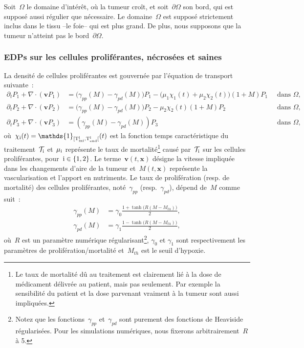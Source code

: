 \documentclass[11pt]{amsart}
\numberwithin{equation}{section}
\newcommand{\treat}{\mathcal{T}}
\newcommand{\Tini}[1]{\rm{T}_{ini}^#1}
\newcommand{\Tend}[1]{\rm{T}_{end}^#1}
\newcommand{\chii}{\chi_{\rm i}}
\newcommand{\chiI}{\chi_1}
\newcommand{\chiS}{\chi_2}
\newcommand{\dive}{\nabla\cdot}
\newcommand{\muI}{\mu_1}
\newcommand{\muS}{\mu_2}
\newcommand{\gammapp}{\gamma_{pp}}
\newcommand{\gammapd}{\gamma_{pd}}
\newcommand{\Ms}{M_{th}}
\newcommand{\vit}{\mathbf{v}}
\newcommand{\vecx}{\mathbf{x}}
\begin{document}
Soit~$\Omega$ le domaine d'intérêt, où la tumeur croît, et soit~$\partial\Omega$ son bord, qui est supposé aussi régulier que nécessaire. Le domaine~$\Omega$ est supposé strictement inclus dans le tissu --le foie-- qui est plus grand. De plus, nous supposons que la tumeur n'atteint pas le bord~$\partial\Omega$.

\subsubsection{EDPs sur les cellules proliférantes, nécrosées et saines}

La densité de cellules proliférantes est gouvernée par l'équation de transport suivante~:
\begin{align}
\partial_t P_1 + \dive(\vit P_1) & =  \big(\gammapp(M)- \gammapd(M)\big)P_1 - \big(\muI \chiI (t)+\muS \chiS(t) \big)(1+M)P_1 & \ \textrm{ dans } \Omega, \label{eq_P1}\\
\partial_t P_2 + \dive(\vit P_2) & = \big(\gammapp(M)- \gammapd(M)\big)P_2 - \muS \chiS(t) (1+M)P_2 & \ \textrm{ dans }  \Omega, \label{eq_P2}\\
\partial_t P_3 + \dive(\vit P_3) & = (\gammapp(M) - \gammapd(M))P_3 & \ \textrm{ dans }  \Omega, \label{eq_P3}
\end{align}
où~$\chii(t)=\mathds{1}_{[\Tini{i},\rm \Tend{i}[}(t)$ est la fonction temps caractéristique du 
traitement~$\treat_{\rm i}$ et~$\mu_{\rm i}$ représente le taux de mortalité\footnote{Le taux de mortalité dû au traitement est clairement lié à la dose de médicament délivrée au patient, mais pas seulement. Par exemple la sensibilité du patient et la dose parvenant vraiment à la tumeur sont aussi impliquées.} causé par~$\treat_{\rm i}$ sur les cellules proliférantes, pour~$\rm i\in\{1,2\}$. 
Le terme~$\vit (t,\vecx)$ désigne la vitesse impliquée dans les changements d'aire de la tumeur et~$M(t,\vecx)$ représente la vascularisation et l'apport en nutriments. 
Le taux de prolifération (resp. de mortalité) des cellules proliférantes, noté~$\gammapp$ (resp.~$\gammapd$), dépend de~$M$ comme suit~:
\begin{align}
\gammapp(M) &=\gamma_0 \frac{1+\tanh\big(R(M-\Ms)\big)}{2}, \label{eq_gammapp}\\
\gammapd(M) &=\gamma_1 \frac{1-\tanh\big(R(M-\Ms)\big)}{2}, \label{eq_gammapd}
\end{align}
où~$R$ est un paramètre numérique régularisant\footnote{Notez que les fonctions~$\gammapp$ et~$\gammapd$ sont purement des fonctions de Heaviside régularisées. Pour les simulations numériques, nous fixerons arbitrairement~$R$ à 5.}, $\gamma_0$ et
$\gamma_1$ sont respectivement les paramètres de 
prolifération/mortalité et~$\Ms$ est le seuil d'hypoxie.
\end{document}
